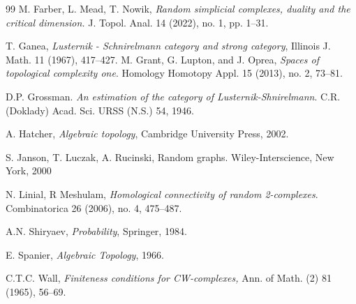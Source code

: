 \documentclass[10pt,a4paper]{amsart}
\begin{document}
\begin{thebibliography}{99}
 M. Farber, L. Mead, T. Nowik, \textit{Random simplicial complexes, duality and the critical dimension.} J. Topol. Anal. 14 (2022), no. 1, pp. 1–31.


 T. Ganea, \textit{Lusternik - Schnirelmann category and strong category}, Illinois J. Math. 11 (1967), 417–427.
 M. Grant, G. Lupton, and J. Oprea, \textit{Spaces of topological complexity one}. Homology Homotopy Appl. 15 (2013), no. 2, 73–81.

 D.P. Grossman. \textit{An estimation of the category of Lusternik-Shnirelmann}. C.R. (Doklady) Acad. Sci. URSS (N.S.) 54, 1946.

 A. Hatcher, \textit{Algebraic topology}, Cambridge University Press, 2002.

 S. Janson, T. Luczak, A. Rucinski,  
Random graphs. Wiley-Interscience, New York, 2000

 N. Linial, R Meshulam, \textit{Homological connectivity of random 2-complexes}. Combinatorica 26 (2006), no. 4, 475–487. 

 A.N. Shiryaev, \textit{Probability}, Springer, 1984.

 E. Spanier, \textit{Algebraic Topology}, 1966. 

 C.T.C. Wall, 
\textit{Finiteness conditions for CW-complexes,} Ann. of Math. (2) 81 (1965), 56–69.



\end{thebibliography}
\end{document}

